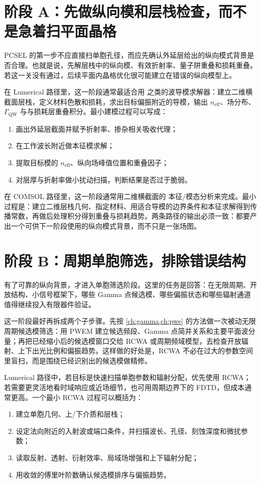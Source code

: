 \section{阶段 A：先做纵向模和层栈检查，而不是急着扫平面晶格}
PCSEL 的第一步不应直接扫单胞孔径，而应先确认外延层给出的纵向模式背景是否合理。也就是说，先解层栈中的纵向模、有效折射率、量子阱重叠和损耗重叠。若这一关没有通过，后续平面内晶格优化很可能建立在错误的纵向模型上。

在 Lumerical 路径里，这一阶段通常最适合用  之类的波导模求解器：建立二维横截面层栈，定义材料色散和损耗，求出目标偏振附近的导模，输出 $n_{\mathrm{eff}}$、场分布、$\Gamma_{\mathrm{QW}}$ 与与损耗层重叠积分。最小建模过程可以写成：
\begin{enumerate}
  \item 画出外延层截面并赋予折射率、掺杂相关吸收代理；
  \item 在工作波长附近做本征模求解；
  \item 提取目标模的 $n_{\mathrm{eff}}$、纵向场峰值位置和重叠因子；
  \item 对层厚与折射率做小扰动扫描，判断结果是否过于脆弱。
\end{enumerate}

在 COMSOL 路径里，这一阶段通常用二维横截面的  本征/模态分析来完成。最小过程是：建立二维层栈几何、指定材料、用适合导模的边界条件和本征求解得到传播常数，再做后处理积分得到重叠与损耗趋势。两条路径的输出必须一致：都要产出一个可供下一阶段使用的纵向模式背景，而不只是一张场图。

\section{阶段 B：周期单胞筛选，排除错误结构}
有了可靠的纵向背景，才进入单胞筛选阶段。这里的任务是回答：在无限周期、开放结构、小信号框架下，哪些 Gamma 点候选模、哪些偏振状态和哪些辐射通道值得继续投入有限器件验证。

这一阶段最好再拆成两个子步骤。先按 \cref{ch:gamma,ch:pwe} 的方法做一次被动无限周期候选模筛选：用 PWEM 建立候选频段、Gamma 点简并关系和主要平面波分量；再把已经缩小后的候选模窗口交给 RCWA 或周期频域模型，去检查开放辐射、上下出光比例和偏振趋势。这样做的好处是，RCWA 不必在过大的参数空间里盲扫，而是围绕已经识别出的候选模做精修。

Lumerical 路径中，若目标是快速扫描单胞参数和辐射分配，优先使用 RCWA；若需要更灵活地看时域响应或近场细节，也可用周期边界下的 FDTD，但成本通常更高。一个最小 RCWA 过程可以概括为：
\begin{enumerate}
  \item 建立单胞几何、上/下介质和层栈；
  \item 设定法向附近的入射波或端口条件，并扫描波长、孔径、刻蚀深度和微扰参数；
  \item 读取反射、透射、衍射效率、局域场增强和上下辐射分配；
  \item 用收敛的傅里叶阶数确认候选模排序与偏振趋势。
\end{enumerate}

